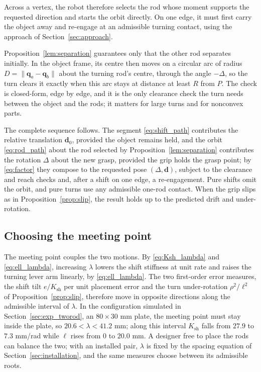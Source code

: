 Across a vertex, the robot therefore selects the rod whose moment supports the requested direction and starts the orbit directly. On one edge, it must first carry the object away and re-engage at an admissible turning contact, using the approach of Section~\ref{sec:approach}.

Proposition~\ref{lem:separation} guarantees only that the other rod separates initially. In the object frame, its centre then moves on a circular arc of radius $D=\|\mathbf q_a-\mathbf q_b\|$ about the turning rod's centre, through the angle $-\Delta$, so the turn clears it exactly when this arc stays at distance at least $R$ from $P$. The check is closed-form, edge by edge, and it is the only clearance check the turn needs between the object and the rods; it matters for large turns and for nonconvex parts.

\label{thm:tworod}
The complete sequence follows. The segment \eqref{eq:shift_path} contributes the relative translation $\mathbf d_0$, provided the object remains held, and the orbit \eqref{eq:rod_path} about the rod selected by Proposition~\ref{lem:separation} contributes the rotation $\Delta$ about the new grasp, provided the grip holds the grasp point; by \eqref{eq:factor} they compose to the requested pose $(\Delta,\mathbf d)$, subject to the clearance and reach checks and, after a shift on one edge, a re-engagement. Pure shifts omit the orbit, and pure turns use any admissible one-rod contact. When the grip slips as in Proposition~\ref{prop:slip}, the result holds up to the predicted drift and under-rotation.

\subsection{Choosing the meeting point}
\label{sec:choose_lambda}

The meeting point couples the two motions. By \eqref{eq:Ksh_lambda} and \eqref{eq:ell_lambda}, increasing $\lambda$ lowers the shift stiffness at unit rate and raises the turning lever arm linearly, by \eqref{eq:ell_lambda}. The two first-order error measures, the shift tilt $e/K_{\mathrm{sh}}$ per unit placement error and the turn under-rotation $\rho^2/\ell^2$ of Proposition~\ref{prop:slip}, therefore move in opposite directions along the admissible interval of $\lambda$. In the configuration simulated in Section~\ref{sec:exp_tworod}, an $80\times30$ mm plate, the meeting point must stay inside the plate, so $20.6<\lambda<41.2$ mm; along this interval $K_{\mathrm{sh}}$ falls from $27.9$ to $7.3$ mm/rad while $\ell$ rises from $0$ to $20.0$ mm. A designer free to place the rods can balance the two; with an installed pair, $\lambda$ is fixed by the spacing equation of Section~\ref{sec:installation}, and the same measures choose between its admissible roots.
